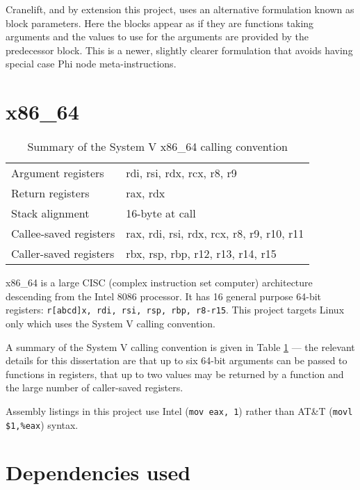 Cranelift, and by extension this project, uses an alternative formulation known as block
parameters.
Here the blocks appear as if they are functions taking arguments and the values to use for the
arguments are provided by the predecessor block. This is a newer, slightly clearer formulation that
avoids having special case Phi node meta-instructions.

\section{x86\_64}

\begin{table}[h]
    \centering

    \begin{tabular}{ll}\toprule
        Argument registers     & rdi, rsi, rdx, rcx, r8, r9                \\
        Return registers       & rax, rdx                                  \\
        Stack alignment        & 16-byte at call                           \\
        Callee-saved registers & rax, rdi, rsi, rdx, rcx, r8, r9, r10, r11 \\
        Caller-saved registers & rbx, rsp, rbp, r12, r13, r14, r15         \\
        \bottomrule
    \end{tabular}

    \caption{Summary of the System V x86\_64 calling convention}
    \label{table:systemv}

\end{table}

x86\_64 is a large CISC (complex instruction set computer) architecture descending from the Intel
8086 processor.
It has 16 general purpose 64-bit registers: \texttt{r[abcd]x, rdi, rsi, rsp, rbp, r8-r15}.
This
project targets Linux only which uses the System V
calling convention.

A summary of the System V calling convention is given in Table \ref{table:systemv} --- the relevant
details for this dissertation are
that up to six 64-bit arguments can be passed to functions in registers, that up to two values may
be returned by a
function
and the large number of caller-saved registers.

Assembly listings in this project use Intel (\texttt{mov eax, 1}) rather than AT\&T (\texttt{movl
    \$1,\%eax}) syntax.

\section{Dependencies used}

